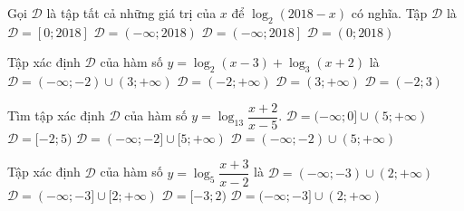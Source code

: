\begin{ex}
	Gọi $\mathscr D$ là tập tất cả những giá trị của $x$ để $\log_2(2018-x)$ có nghĩa. Tập $\mathscr D$ là
	\choice
	{$\mathscr D=[0;2018]$}
	{\True $\mathscr D=(-\infty;2018)$}
	{$\mathscr D=\left( -\infty;2018\right]$}
	{$\mathscr D=(0;2018)$}
\end{ex}

\begin{ex}
	Tập xác định $\mathscr{D}$ của hàm số $y=\log_2 (x-3)+\log_3 (x+2)$ là
	\choice
	{$\mathscr{D}=(-\infty;-2)\cup (3;+\infty)$}
	{$\mathscr{D}=(-2;+\infty)$}
	{\True $\mathscr{D}=(3;+\infty)$}
	{$\mathscr{D}=(-2;3)$}
\end{ex}



\begin{ex}
	Tìm tập xác định $\mathscr{D}$ của hàm số $y=\log_{13}\dfrac{x+2}{x-5}$.
	\choice
	{$\mathscr{D}=(-\infty;0]\cup (5;+\infty)$}
	{$\mathscr{D}=[-2;5)$}
	{$\mathscr{D}=(-\infty;-2]\cup [5;+\infty)$}
	{\True $\mathscr{D}=(-\infty;-2)\cup (5;+\infty)$}
\end{ex}


\begin{ex}
	Tập xác định $\mathscr{D}$ của hàm số $y=\log_{5}\dfrac{x+3}{x-2}$ là
	\choice
	{\True $\mathscr{D} = (-\infty;-3) \cup (2;+\infty)$ }
	{ $\mathscr{D} = (-\infty;-3] \cup [2;+\infty)$ }
	{ $\mathscr{D} = [-3;2)$ }
	{ $\mathscr{D} = (-\infty;-3] \cup (2;+\infty)$ }
\end{ex}

